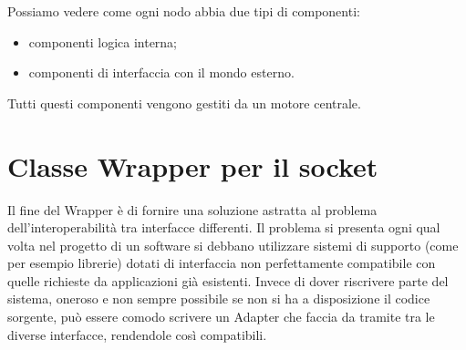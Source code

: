 Possiamo vedere come ogni nodo abbia due tipi di componenti:
\begin{itemize}
 \item componenti logica interna;
 \item componenti di interfaccia con il mondo esterno.
\end{itemize}

Tutti questi componenti vengono gestiti da un motore centrale.


\section{Classe Wrapper per il socket}\label{sec:wrap_sock}
Il fine del Wrapper è di fornire una soluzione astratta al problema dell'interoperabilità tra interfacce differenti. Il problema si presenta ogni qual volta nel progetto di un software si debbano utilizzare sistemi di supporto (come per esempio librerie) dotati di interfaccia non perfettamente compatibile con quelle richieste da applicazioni già esistenti. Invece di dover riscrivere parte del sistema, oneroso e non sempre possibile se non si ha a disposizione il codice sorgente, può essere comodo scrivere un Adapter che faccia da tramite tra le diverse interfacce, rendendole così compatibili.
